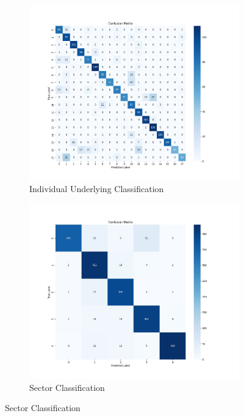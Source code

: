 \documentclass[10pt]{article}
\begin{document}
\begin{figure}[H]
\centering
\begin{subfigure}{.5\textwidth}
  \centering
  \includegraphics[width=1\linewidth]{Confusion_Matrix_REAL.png}
  \caption{Individual Underlying Classification}
  \label{fig:sub1}
\end{subfigure}%
\begin{subfigure}{.5\textwidth}
  \centering
  \includegraphics[width=1\linewidth]{Confusion matrix 2.jpg}
  \caption{Sector Classification}
  \label{fig:sub2}
\end{subfigure}
\end{figure}
\end{document}
